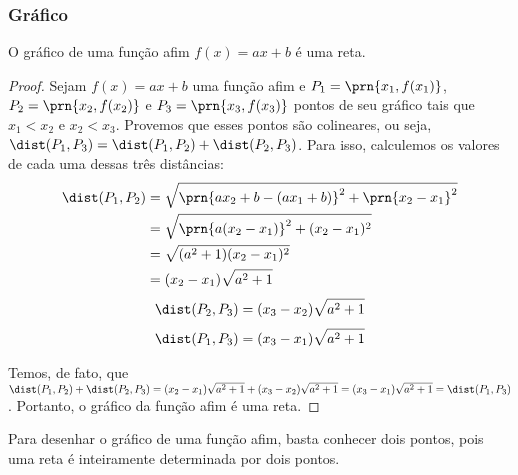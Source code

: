 \subsubsection{Gráfico}

\begin{proposition}
    O gráfico de uma função afim $f(x) = ax + b$ é uma reta.
\end{proposition}

\begin{proof}
    Sejam $f(x)=ax+b$ uma função afim e $P_1 = \prn{x_1, f(x_1)}$, $P_2 = \prn{x_2, f(x_2)}$
    e $P_3 = \prn{x_3, f(x_3)}$ pontos de seu gráfico tais que $x_1 < x_2$ e $x_2 < x_3$. 
    Provemos que esses pontos são colineares, ou seja, $\dist(P_1, P_3) = \dist(P_1, P_2) + \dist(P_2, P_3)$.
    Para isso, calculemos os valores de cada uma dessas três distâncias:
    \begin{align*}
        \dist(P_1, P_2) &= \sqrt{\prn{ax_2+b-(ax_1+b)}^2 + \prn{x_2-x_1}^2} \\
        &= \sqrt{\prn{a(x_2-x_1)}^2+(x_2-x_1)^2} \\
        &= \sqrt{(a^2+1)(x_2-x_1)^2}\\
        &= (x_2-x_1)\sqrt{a^2+1}
    \end{align*}
    \begin{align*}
        \dist(P_2, P_3)=(x_3-x_2)\sqrt{a^2+1}
    \end{align*}
    \begin{align*}
        \dist(P_1,P_3)=(x_3-x_1)\sqrt{a^2+1}
    \end{align*}
    
    Temos, de fato, que $\dist(P_1, P_2) + \dist(P_2, P_3) = (x_2-x_1)\sqrt{a^2+1}+(x_3-x_2)\sqrt{a^2+1} = (x_3-x_1)\sqrt{a^2+1} 
    = \dist(P_1,P_3)$. Portanto, o gráfico da função afim é uma reta.
\end{proof}

\begin{remark}
Para desenhar o gráfico de uma função afim, basta conhecer dois pontos, 
pois uma reta é inteiramente determinada por dois pontos.
\end{remark}